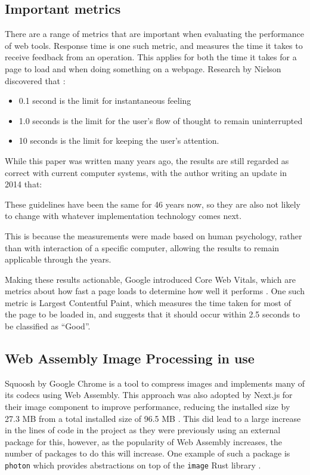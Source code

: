 \documentclass[12pt,a4paper]{article}
\begin{document}
\subsection{Important metrics}

There are a range of metrics that are important when evaluating the performance of web tools. Response time is one such metric, and measures the time it takes to receive feedback from an operation. This applies for both the time it takes for a page to load and when doing something on a webpage. Research by Nielson discovered that \cite{nielsen1994usability}:
\begin{itemize}
    \item 0.1 second is the limit for instantaneous feeling
    \item 1.0 seconds is the limit for the user's flow of thought to remain uninterrupted
    \item 10 seconds is the limit for keeping the user's attention.
\end{itemize}

While this paper was written many years ago, the results are still regarded as correct with current computer systems, with the author writing an update in 2014 that:

\begin{displayquote}
    These guidelines have been the same for 46 years now, so they are also not likely to change with whatever implementation technology comes next. \cite{responsetimes}
\end{displayquote}

This is because the measurements were made based on human psychology, rather than with interaction of a specific computer, allowing the results to remain applicable through the years.

Making these results actionable, Google introduced Core Web Vitals, which are metrics about how fast a page loads to determine how well it performs \cite{webvitals}. One such metric is Largest Contentful Paint, which measures the time taken for most of the page to be loaded in, and suggests that it should occur within 2.5 seconds to be classified as “Good”.




\subsection{Web Assembly Image Processing in use}

Squoosh by Google Chrome is a tool to compress images and implements many of its codecs using Web Assembly. This approach was also adopted by Next.js for their image component to improve performance, reducing the installed size by 27.3 MB from a total installed size of 96.5 MB \cite{nextjs}. This did lead to a large increase in the lines of code in the project as they were previously using an external package for this, however, as the popularity of Web Assembly increases, the number of packages to do this will increase. One example of such a package is \texttt{photon} which provides abstractions on top of the \texttt{image} Rust library \cite{photon}.
\end{document}
